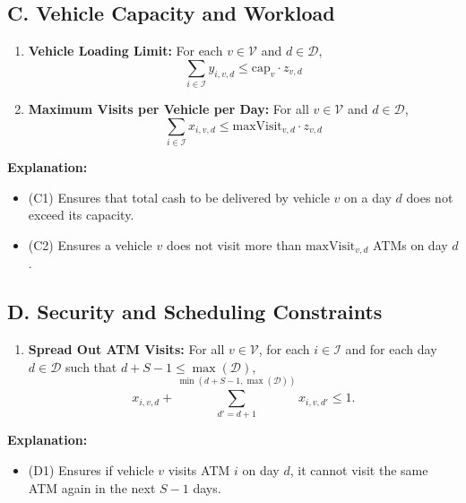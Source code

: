 \documentclass[11pt]{article}
\begin{document}
\subsection*{C. Vehicle Capacity and Workload}
\begin{enumerate}[label=\textbf{(C\arabic*)}]
    \item \textbf{Vehicle Loading Limit:} For each \(v \in \mathcal{V}\) and \(d \in \mathcal{D}\),
    \[
    \sum_{i \in \mathcal{I}} y_{i,v,d} \le \text{cap}_v \cdot z_{v,d}
    \]
    \item \textbf{Maximum Visits per Vehicle per Day:} For all \(v \in \mathcal{V}\) and \(d \in \mathcal{D}\),
    \[
    \sum_{i \in \mathcal{I}} x_{i,v,d} \le \text{maxVisit}_{v,d} \cdot z_{v,d}
    \]
\end{enumerate}

\noindent \textbf{Explanation:}
\begin{itemize}[leftmargin=1cm]
    \item (C1) Ensures that total cash to be delivered by vehicle \(v\) on a day \(d\) does not exceed its capacity.
    \item (C2) Ensures a vehicle \(v\) does not visit more than \(\text{maxVisit}_{v,d}\) ATMs on day \(d\).
\end{itemize}

\subsection*{D. Security and Scheduling Constraints}
\begin{enumerate}[label=\textbf{(D\arabic*)}]
    \item \textbf{Spread Out ATM Visits:} For all \(v \in \mathcal{V}\), for each \(i \in \mathcal{I}\) and for each day \(d \in \mathcal{D}\) such that \(d+S-1 \le \max(\mathcal{D})\),
    \[
    x_{i,v,d} + \sum_{d' = d+1}^{\min(d+S-1,\max(\mathcal{D}))} x_{i,v,d'} \le 1.
    \]
\end{enumerate}

\noindent \textbf{Explanation:}
\begin{itemize}[leftmargin=1cm]
    \item (D1) Ensures if vehicle \(v\) visits ATM \(i\) on day \(d\), it cannot visit the same ATM again in the next \(S-1\) days.
\end{itemize}
\end{document}
